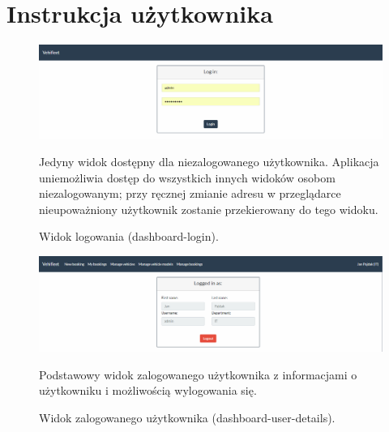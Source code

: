 \documentclass[eng,printmode,openany]{mgr}
\begin{document}
	
	\chapter{Instrukcja użytkownika}
	\begin{figure}[H]
		\centering
		\includegraphics[width=\textwidth]{images/views/dashboard-login.png}
		\caption{Widok logowania (dashboard-login).}
		\small 
		Jedyny widok dostępny dla niezalogowanego użytkownika. Aplikacja uniemożliwia dostęp do wszystkich innych widoków osobom niezalogowanym; przy ręcznej zmianie adresu w przeglądarce nieupoważniony użytkownik zostanie przekierowany do tego widoku.
	\end{figure}
	
	\begin{figure}[H]
		\centering
		\includegraphics[width=\textwidth]{images/views/dashboard-logout.png}
		\caption{Widok zalogowanego użytkownika (dashboard-user-details).}
		\small 
		Podstawowy widok zalogowanego użytkownika z informacjami o użytkowniku i możliwością wylogowania się.
	\end{figure}
	
\end{document}
